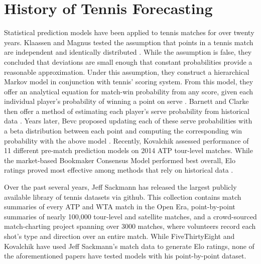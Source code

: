 \documentclass[chapterprefix=false]{report}
\begin{document}



\section{History of Tennis Forecasting}

Statistical prediction models have been applied to tennis matches for over twenty years. Klaassen and Magnus tested the assumption that points in a tennis match are independent and identically distributed \cite{KlaassenandMagnus2001}. While the assumption is false, they concluded that deviations are small enough that constant probabilities provide a reasonable approximation. Under this assumption, they construct a hierarchical Markov model in conjunction with tennis' scoring system. From this model, they offer an analytical equation for match-win probability from any score, given each individual player's probability of winning a point on serve \cite{Klaassen2003}.  Barnett and Clarke then offer a method of estimating each player's serve probability from historical data \cite{BarnettandClarke2005}. Years later, Bevc proposed updating each of these serve probabilities with a beta distribution between each point and computing the corresponding win probability with the above model \cite{Bevc2015}. Recently, Kovalchik assessed performance of 11 different pre-match prediction models on 2014 ATP tour-level matches. While the market-based Bookmaker Consensus Model performed best overall, Elo ratings proved most effective among methods that rely on historical data \cite{Kovalchik2016}.

Over the past several years, Jeff Sackmann has released the largest publicly available library of tennis datasets via github. This collection contains match summaries of every ATP and WTA match in the Open Era, point-by-point summaries of nearly 100,000 tour-level and satellite matches, and a crowd-sourced match-charting project spanning over 3000 matches, where volunteers record each shot’s type and direction over an entire match. While FiveThirtyEight and Kovalchik have used Jeff Sackmann’s match data to generate Elo ratings, none of the aforementioned papers have tested models with his point-by-point dataset.
\end{document}
